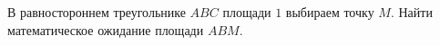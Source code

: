 \documentclass{article}
\begin{document}
В равностороннем треугольнике $ABC$ площади $1$ выбираем точку $M$. Найти математическое ожидание площади $ABM$.
\end{document}
